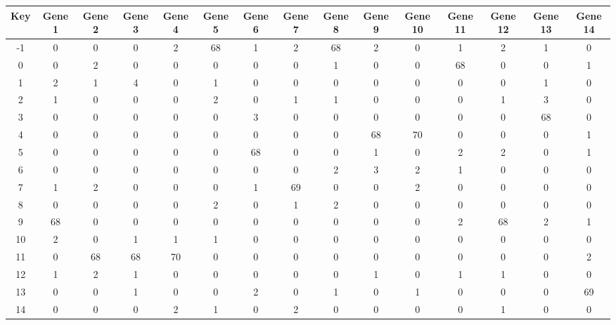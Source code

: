 \begin{tabular}{|c|c|c|c|c|c|c|c|c|c|c|c|c|c|c|}
\hline
Key & Gene 1 & Gene 2 & Gene 3 & Gene 4 & Gene 5 & Gene 6 & Gene 7 & Gene 8 & Gene 9 & Gene 10 & Gene 11 & Gene 12 & Gene 13 & Gene 14 \\
\hline
-1 & 0 & 0 & 0 & 2 & 68 & 1 & 2 & 68 & 2 & 0 & 1 & 2 & 1 & 0 \\
0 & 0 & 2 & 0 & 0 & 0 & 0 & 0 & 1 & 0 & 0 & 68 & 0 & 0 & 1 \\
1 & 2 & 1 & 4 & 0 & 1 & 0 & 0 & 0 & 0 & 0 & 0 & 0 & 1 & 0 \\
2 & 1 & 0 & 0 & 0 & 2 & 0 & 1 & 1 & 0 & 0 & 0 & 1 & 3 & 0 \\
3 & 0 & 0 & 0 & 0 & 0 & 3 & 0 & 0 & 0 & 0 & 0 & 0 & 68 & 0 \\
4 & 0 & 0 & 0 & 0 & 0 & 0 & 0 & 0 & 68 & 70 & 0 & 0 & 0 & 1 \\
5 & 0 & 0 & 0 & 0 & 0 & 68 & 0 & 0 & 1 & 0 & 2 & 2 & 0 & 1 \\
6 & 0 & 0 & 0 & 0 & 0 & 0 & 0 & 2 & 3 & 2 & 1 & 0 & 0 & 0 \\
7 & 1 & 2 & 0 & 0 & 0 & 1 & 69 & 0 & 0 & 2 & 0 & 0 & 0 & 0 \\
8 & 0 & 0 & 0 & 0 & 2 & 0 & 1 & 2 & 0 & 0 & 0 & 0 & 0 & 0 \\
9 & 68 & 0 & 0 & 0 & 0 & 0 & 0 & 0 & 0 & 0 & 2 & 68 & 2 & 1 \\
10 & 2 & 0 & 1 & 1 & 1 & 0 & 0 & 0 & 0 & 0 & 0 & 0 & 0 & 0 \\
11 & 0 & 68 & 68 & 70 & 0 & 0 & 0 & 0 & 0 & 0 & 0 & 0 & 0 & 2 \\
12 & 1 & 2 & 1 & 0 & 0 & 0 & 0 & 0 & 1 & 0 & 1 & 1 & 0 & 0 \\
13 & 0 & 0 & 1 & 0 & 0 & 2 & 0 & 1 & 0 & 1 & 0 & 0 & 0 & 69 \\
14 & 0 & 0 & 0 & 2 & 1 & 0 & 2 & 0 & 0 & 0 & 0 & 1 & 0 & 0 \\
\hline
\end{tabular}